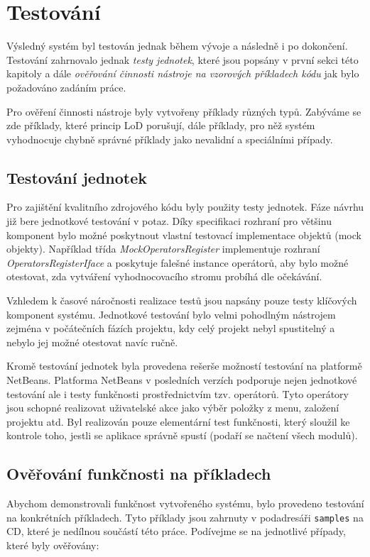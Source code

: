 \chapter{Testování}

Výsledný systém byl testován jednak během vývoje a následně i po dokončení. Testování zahrnovalo jednak \emph{testy jednotek}, které jsou popsány v první sekci této kapitoly a dále \emph{ověřování činnosti nástroje na vzorových příkladech kódu} jak bylo požadováno zadáním práce.

Pro ověření činnosti nástroje byly vytvořeny příklady různých typů. Zabýváme se zde příklady, které princip LoD porušují, dále příklady, pro něž systém vyhodnocuje chybně správné příklady jako nevalidní a speciálními případy.

\section{Testování jednotek}
Pro zajištění kvalitního zdrojového kódu byly použity testy jednotek. Fáze návrhu již bere jednotkové testování v potaz. Díky specifikaci rozhraní pro většinu komponent bylo možné poskytnout vlastní testovací implementace objektů (mock objekty). Například třída \emph{MockOperatorsRegister} implementuje rozhraní \emph{OperatorsRegisterIface} a poskytuje falešné instance operátorů, aby bylo možné otestovat, zda vytváření vyhodnocovacího stromu probíhá dle očekávání.

Vzhledem k časové náročnosti realizace testů jsou napsány pouze testy klíčových komponent systému. Jednotkové testování bylo velmi pohodlným nástrojem zejména v počátečních fázích projektu, kdy celý projekt nebyl spustitelný a nebylo jej možné otestovat navíc ručně.

Kromě testování jednotek byla provedena rešerše možností testování na platformě NetBeans. Platforma NetBeans v posledních verzích podporuje nejen jednotkové testování ale i testy funkčnosti prostřednictvím tzv. operátorů. Tyto operátory jsou schopné realizovat uživatelské akce jako výběr položky z menu, založení projektu atd. Byl realizován pouze elementární test funkčnosti, který sloužil ke kontrole toho, jestli se aplikace správně spustí (podaří se načtení všech modulů).

\section{Ověřování funkčnosti na příkladech}
Abychom demonstrovali funkčnost vytvořeného systému, bylo provedeno testování na konkrétních příkladech. Tyto příklady jsou zahrnuty v podadresáři \verb+samples+ na CD, které je nedílnou součástí této práce. Podívejme se na jednotlivé případy, které byly ověřovány:

